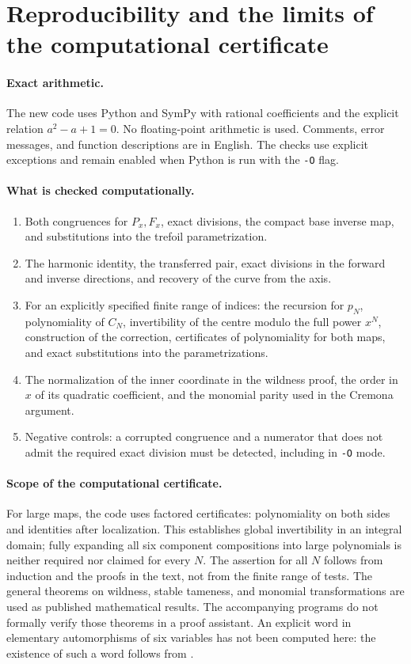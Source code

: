 \section{Reproducibility and the limits of the computational certificate}
\label{sec:reproducibility}

\paragraph{Exact arithmetic.}
The new code uses Python and SymPy with rational coefficients and the
explicit relation $a^2-a+1=0$. No floating-point arithmetic is used.
Comments, error messages, and function descriptions are in English.
The checks use explicit exceptions and remain enabled when Python is
run with the \texttt{-O} flag.

\paragraph{What is checked computationally.}
\begin{enumerate}
\item Both congruences for $P_x,F_x$, exact divisions, the compact base
inverse map, and substitutions into the trefoil parametrization.
\item The harmonic identity, the transferred pair, exact divisions in
the forward and inverse directions, and recovery of the curve from the axis.
\item For an explicitly specified finite range of indices: the recursion
for $p_N$, polynomiality of $C_N$, invertibility of the centre modulo the
full power $x^N$, construction of the correction, certificates of
polynomiality for both maps, and exact substitutions into the parametrizations.
\item The normalization of the inner coordinate in the wildness proof,
the order in $x$ of its quadratic coefficient, and the monomial parity
used in the Cremona argument.
\item Negative controls: a corrupted congruence and a numerator that
does not admit the required exact division must be detected, including
in \texttt{-O} mode.
\end{enumerate}

\paragraph{Scope of the computational certificate.}
For large maps, the code uses factored certificates: polynomiality on
both sides and identities after localization. This establishes global
invertibility in an integral domain; fully expanding all six component
compositions into large polynomials is neither required nor claimed for
every $N$.
The assertion for all $N$ follows from induction and the proofs in the
text, not from the finite range of tests. The general theorems on
wildness, stable tameness, and monomial transformations are used as
published mathematical results. The accompanying programs do not
formally verify those theorems in a proof assistant.
An explicit word in elementary automorphisms of six variables has not
been computed here: the existence of such a word follows from
\cite{BEW2012}.


